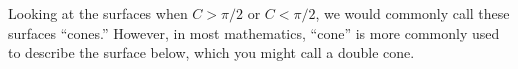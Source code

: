 \documentclass{ximera}
\begin{document}
\begin{image}
\end{image}

Looking at the surfaces when $C>\pi/2$ or $C<\pi/2$, we would commonly call these surfaces ``cones.'' However, in most mathematics, ``cone'' is more commonly used to describe the surface below, which you might call a double cone.
\end{document}
